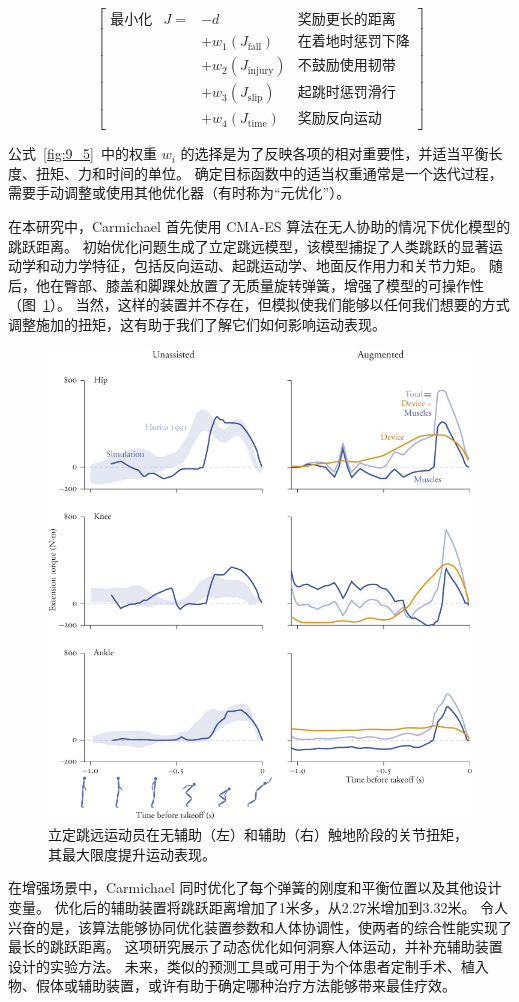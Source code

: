 \begin{equation}
	\begin{bmatrix}
		\text{最小化} & J= & -d & \text{奖励更长的距离} \\
		& & + w_1 (J_\text{fall}) & \text{在着地时惩罚下降} \\
		& & + w_2 (J_\text{injury}) & \text{不鼓励使用韧带} \\
		& & + w_3 (J_\text{slip}) & \text{起跳时惩罚滑行} \\
		& & + w_4 (J_\text{time}) & \text{奖励反向运动}
	\end{bmatrix}
	\label{eq:9_5}
\end{equation}

公式~\ref{fig:9_5}~中的权重 $w_i$ 的选择是为了反映各项的相对重要性，并适当平衡长度、扭矩、力和时间的单位。
确定目标函数中的适当权重通常是一个迭代过程，需要手动调整或使用其他优化器（有时称为“元优化”）。


在本研究中，Carmichael 首先使用 CMA-ES 算法在无人协助的情况下优化模型的跳跃距离。
初始优化问题生成了立定跳远模型，该模型捕捉了人类跳跃的显著运动学和动力学特征，包括反向运动、起跳运动学、地面反作用力和关节力矩。
随后，他在臀部、膝盖和脚踝处放置了无质量旋转弹簧，增强了模型的可操作性（图~\ref{fig:9_17}）。
当然，这样的装置并不存在，但模拟使我们能够以任何我们想要的方式调整施加的扭矩，这有助于我们了解它们如何影响运动表现。


\begin{figure}[!htb]
	\centering
	\includegraphics[width=1.0\linewidth]{chap9/9_17}
	\caption{立定跳远运动员在无辅助（左）和辅助（右）触地阶段的关节扭矩，其最大限度提升运动表现\cite{horita1991body}。 \label{fig:9_17}}
\end{figure}


在增强场景中，Carmichael 同时优化了每个弹簧的刚度和平衡位置以及其他设计变量。
优化后的辅助装置将跳跃距离增加了1米多，从2.27米增加到3.32米。
令人兴奋的是，该算法能够协同优化装置参数和人体协调性，使两者的综合性能实现了最长的跳跃距离。
这项研究展示了动态优化如何洞察人体运动，并补充辅助装置设计的实验方法。
未来，类似的预测工具或可用于为个体患者定制手术、植入物、假体或辅助装置，或许有助于确定哪种治疗方法能够带来最佳疗效。







